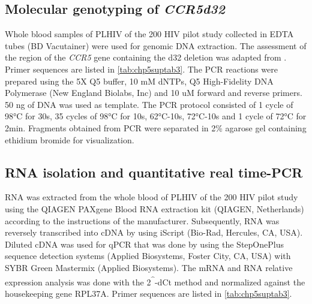 \documentclass{book}
\begin{document}
\begin{refsection}
\subsection*{Molecular genotyping of \textit{CCR5d32}}
Whole blood samples of PLHIV of the 200 HIV pilot study collected in EDTA tubes (BD Vacutainer) were used for genomic DNA extraction.
The assessment of the region of the \textit{CCR5} gene containing the d32 deletion was adapted from \cite{Fahrioglu2020CCR5}.
Primer sequences are listed in \ref{tab:chp5suptab3}.
The PCR reactions were prepared using the 5X Q5 buffer, 10 mM dNTPs, Q5 High-Fidelity DNA Polymerase (New England Biolabs, Inc) and 10 uM forward and reverse primers.
50 ng of DNA was used as template.
The PCR protocol consisted of 1 cycle of 98°C for 30s, 35 cycles of 98°C for 10s, 62°C-10s, 72°C-10s and 1 cycle of 72°C for 2min.
Fragments obtained from PCR were separated in 2\% agarose gel containing ethidium bromide for visualization.

\subsection*{RNA isolation and quantitative real time-PCR}
RNA was extracted from the whole blood of PLHIV of the 200 HIV pilot study using the QIAGEN PAXgene Blood RNA extraction kit (QIAGEN, Netherlands) according to the instructions of the manufacturer.
Subsequently, RNA was reversely transcribed into cDNA by using iScript (Bio-Rad, Hercules, CA, USA).
Diluted cDNA was used for qPCR that was done by using the StepOnePlus sequence detection systems (Applied Biosystems, Foster City, CA, USA) with SYBR Green Mastermix (Applied Biosystems).
The mRNA and RNA relative expression analysis was done with the 2\textsuperscript{\string^}-dCt method and normalized against the housekeeping gene RPL37A.
Primer sequences are listed in \ref{tab:chp5suptab3}.


\end{refsection}
\end{document}
